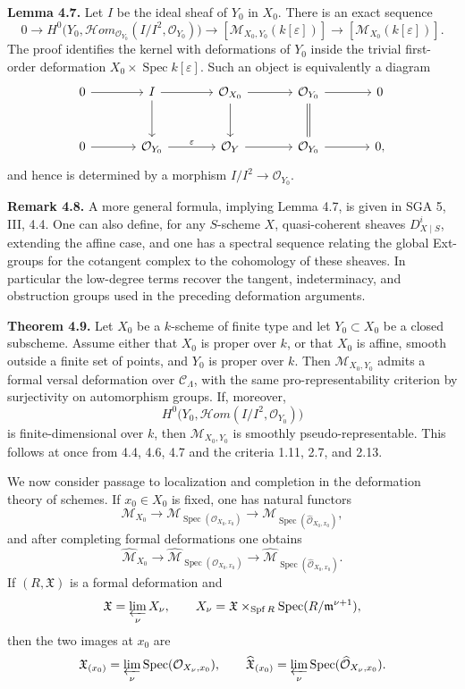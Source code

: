 \documentclass[11pt]{article}
\providecommand{\Spec}{\operatorname{Spec}}
\providecommand{\Spf}{\operatorname{Spf}}
\begin{document}
\textbf{Lemma 4.7.} Let \(I\) be the ideal sheaf of \(Y_0\) in \(X_0\). There is an exact sequence
\[
0\to H^0\bigl(Y_0,\mathcal Hom_{\mathcal O_{Y_0}}(I/I^2,\mathcal O_{Y_0})\bigr)
\to [\mathcal M_{X_0,Y_0}(k[\varepsilon])]
\to [\mathcal M_{X_0}(k[\varepsilon])].
\]
The proof identifies the kernel with deformations of \(Y_0\) inside the trivial first-order deformation \(X_0\times\Spec k[\varepsilon]\). Such an object is equivalently a diagram
\[
\begin{tikzcd}[column sep=large,row sep=large]
 0 \arrow[r] & I \arrow[r] \arrow[d] & \mathcal O_{X_0} \arrow[r] \arrow[d] & \mathcal O_{Y_0} \arrow[r] \arrow[d,equal] & 0\\
 0 \arrow[r] & \mathcal O_{Y_0} \arrow[r,"\varepsilon"] & \mathcal O_Y \arrow[r] & \mathcal O_{Y_0} \arrow[r] & 0,
\end{tikzcd}
\]
and hence is determined by a morphism \(I/I^2\to\mathcal O_{Y_0}\).

\textbf{Remark 4.8.} A more general formula, implying Lemma 4.7, is given in SGA 5, III, 4.4. One can also define, for any \(S\)-scheme \(X\), quasi-coherent sheaves \(D^i_{X\mid S}\), extending the affine case, and one has a spectral sequence relating the global Ext-groups for the cotangent complex to the cohomology of these sheaves. In particular the low-degree terms recover the tangent, indeterminacy, and obstruction groups used in the preceding deformation arguments.

\textbf{Theorem 4.9.} Let \(X_0\) be a \(k\)-scheme of finite type and let \(Y_0\subset X_0\) be a closed subscheme. Assume either that \(X_0\) is proper over \(k\), or that \(X_0\) is affine, smooth outside a finite set of points, and \(Y_0\) is proper over \(k\). Then \(\mathcal M_{X_0,Y_0}\) admits a formal versal deformation over \(\mathcal C_\Lambda\), with the same pro-representability criterion by surjectivity on automorphism groups. If, moreover,
\[
 H^0\bigl(Y_0,\mathcal Hom(I/I^2,\mathcal O_{Y_0})\bigr)
\]
is finite-dimensional over \(k\), then \(\mathcal M_{X_0,Y_0}\) is smoothly pseudo-representable. This follows at once from 4.4, 4.6, 4.7 and the criteria 1.11, 2.7, and 2.13.


We now consider passage to localization and completion in the deformation theory of schemes.  If \(x_0\in X_0\) is fixed, one has natural functors
\[
 \mathcal M_{X_0}\longrightarrow
 \mathcal M_{\Spec(\mathcal O_{X_0,x_0})}
 \longrightarrow
 \mathcal M_{\Spec(\widehat{\mathcal O}_{X_0,x_0})},
\]
and after completing formal deformations one obtains
\[
 \widehat{\mathcal M}_{X_0}\longrightarrow
 \widehat{\mathcal M}_{\Spec(\mathcal O_{X_0,x_0})}
 \longrightarrow
 \widehat{\mathcal M}_{\Spec(\widehat{\mathcal O}_{X_0,x_0})}.
\]
If \((R,\mathfrak X)\) is a formal deformation and
\[
 \mathfrak X=\varprojlim_\nu X_\nu,\qquad
 X_\nu=\mathfrak X\times_{\Spf R}\Spec(R/\mathfrak m^{\nu+1}),
\]
then the two images at \(x_0\) are
\[
 \mathfrak X_{(x_0)}=\varprojlim_\nu\Spec(\mathcal O_{X_\nu,x_0}),\qquad
 \widehat{\mathfrak X}_{(x_0)}=\varprojlim_\nu\Spec(\widehat{\mathcal O}_{X_\nu,x_0}).
\]
\end{document}

